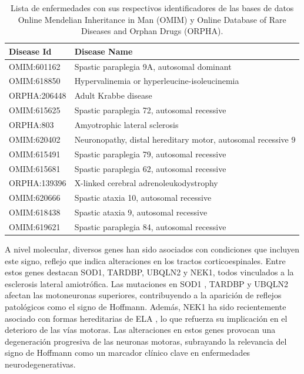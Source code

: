 \begin{table}[h!]
	\centering
	\caption{Lista de enfermedades con sus respectivos identificadores de las bases de datos Online Mendelian Inheritance in Man (OMIM)\cite{omim} y Online Database of Rare Diseases and Orphan Drugs (ORPHA)\cite{orphanet}.}
	\setlength{\extrarowheight}{2pt}
	\begin{tabular}{|>{\centering\arraybackslash}m{3cm}|>{\raggedright\arraybackslash}m{10cm}|}
		\hline
		\textbf{Disease Id}  & \textbf{Disease Name} \\ \hline
		OMIM:601162          & Spastic paraplegia 9A, autosomal dominant \\ \hline
		OMIM:618850          & Hypervalinemia or hyperleucine-isoleucinemia \\ \hline
		ORPHA:206448         & Adult Krabbe disease \\ \hline
		OMIM:615625          & Spastic paraplegia 72, autosomal recessive \\ \hline
		ORPHA:803            & Amyotrophic lateral sclerosis \\ \hline
		OMIM:620402          & Neuronopathy, distal hereditary motor, autosomal recessive 9 \\ \hline
		OMIM:615491          & Spastic paraplegia 79, autosomal recessive \\ \hline
		OMIM:615681          & Spastic paraplegia 62, autosomal recessive \\ \hline
		ORPHA:139396         & X-linked cerebral adrenoleukodystrophy \\ \hline
		OMIM:620666          & Spastic ataxia 10, autosomal recessive \\ \hline
		OMIM:618438          & Spastic ataxia 9, autosomal recessive \\ \hline
		OMIM:619621          & Spastic paraplegia 84, autosomal recessive \\ \hline
	\end{tabular}
	\label{tab:disease_list}
\end{table}

A nivel molecular, diversos genes han sido asociados con condiciones que incluyen este signo, reflejo que indica alteraciones en los tractos corticoespinales. Entre estos genes destacan SOD1, TARDBP, UBQLN2 y NEK1, todos vinculados a la esclerosis lateral amiotrófica. Las mutaciones en SOD1 \cite{zhao2022g41d}, TARDBP \cite{sanchez2022atypical} y UBQLN2 \cite{teyssou:hal-03001781} afectan las motoneuronas superiores, contribuyendo a la aparición de reflejos patológicos como el signo de Hoffmann. Además, NEK1 ha sido recientemente asociado con formas hereditarias de ELA \cite{mann2023NEK1}, lo que refuerza su implicación en el deterioro de las vías motoras. Las alteraciones en estos genes provocan una degeneración progresiva de las neuronas motoras, subrayando la relevancia del signo de Hoffmann como un marcador clínico clave en enfermedades neurodegenerativas.








